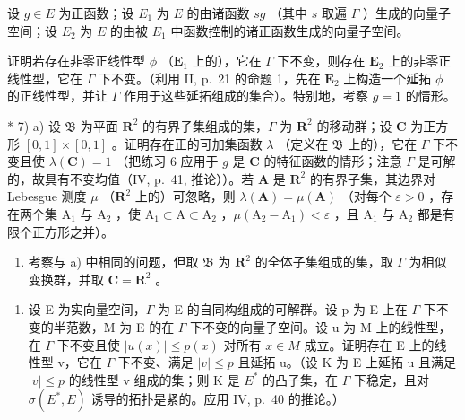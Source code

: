 设 \(g \in E\) 为正函数；设 \(E_1\) 为 \(E\) 的由诸函数 \(sg\) （其中 \(s\) 取遍 \(\Gamma\) ）生成的向量子空间；设 \(E_2\) 为 \(E\) 的由被 \(E_1\) 中函数控制的诸正函数生成的向量子空间。

证明若存在非零正线性型 \(\phi\) （\(\mathbf{E}_1\) 上的），它在 \(\Gamma\) 下不变，则存在 \(\mathbf{E}_2\) 上的非零正线性型，它在 \(\Gamma\) 下不变。（利用 II, p.~21 的命题 1，先在 \(\mathbf{E}_2\) 上构造一个延拓 \(\phi\) 的正线性型，并让 \(\Gamma\) 作用于这些延拓组成的集合）。特别地，考察 \(g = 1\) 的情形。

* 7) a) 设 \(\mathfrak{B}\) 为平面 \(\mathbf{R}^2\) 的有界子集组成的集，\(\Gamma\) 为 \(\mathbf{R}^2\) 的移动群；设 \(\mathbf{C}\) 为正方形 \([0,1]\times [0,1]\) 。证明存在正的可加集函数 \(\lambda\) （定义在 \(\mathfrak{B}\) 上的），它在 \(\Gamma\) 下不变且使 \(\lambda (\mathbf{C}) = 1\) （把练习 6 应用于 \(g\) 是 \(\mathbf{C}\) 的特征函数的情形；注意 \(\Gamma\) 是可解的，故具有不变均值（IV, p.~41, 推论））。若 \(\mathbf{A}\) 是 \(\mathbf{R}^2\) 的有界子集，其边界对 Lebesgue 测度 \(\mu\) （\(\mathbf{R}^2\) 上的）可忽略，则 \(\lambda (\mathbf{A}) = \mu (\mathbf{A})\) （对每个 \(\varepsilon >0\) ，存在两个集 \(\mathrm{A}_1\) 与 \(\mathrm{A}_2\) ，使 \(\mathrm{A}_1\subset \mathrm{A}\subset \mathrm{A}_2\) ，\(\mu (\mathrm{A}_2 - \mathrm{A}_1) < \varepsilon\) ，且 \(\mathrm{A}_1\) 与 \(\mathrm{A}_2\) 都是有限个正方形之并）。

\begin{enumerate}
\def\labelenumi{\alph{enumi})}
\setcounter{enumi}{1}
\tightlist
\item
  考察与 a) 中相同的问题，但取 \(\mathfrak{B}\) 为 \(\mathbf{R}^2\) 的全体子集组成的集，取 \(\Gamma\) 为相似变换群，并取 \(\mathbf{C} = \mathbf{R}^2\) 。
\end{enumerate}

\begin{enumerate}
\def\labelenumi{\arabic{enumi})}
\setcounter{enumi}{7}
\tightlist
\item
  设 E 为实向量空间，\(\Gamma\) 为 E 的自同构组成的可解群。设 p 为 E 上在 \(\Gamma\) 下不变的半范数，M 为 E 的在 \(\Gamma\) 下不变的向量子空间。设 u 为 M 上的线性型，在 \(\Gamma\) 下不变且使 \(|u(x)| \leqslant p(x)\) 对所有 \(x \in M\) 成立。证明存在 E 上的线性型 v，它在 \(\Gamma\) 下不变、满足 \(|v| \leqslant p\) 且延拓 u。（设 K 为 E 上延拓 u 且满足 \(|v| \leqslant p\) 的线性型 v 组成的集；则 K 是 \(E^{*}\) 的凸子集，在 \(\Gamma\) 下稳定，且对 \(\sigma(E^{*}, E)\) 诱导的拓扑是紧的。应用 IV, p.~40 的推论。）
\end{enumerate}

